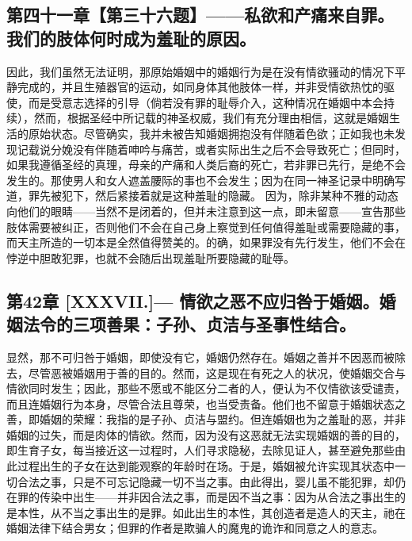 
\subsection{第四十一章【第三十六题】——私欲和产痛来自罪。我们的肢体何时成为羞耻的原因。}

因此，我们虽然无法证明，那原始婚姻中的婚姻行为是在没有情欲骚动的情况下平静完成的，并且生殖器官的运动，如同身体其他肢体一样，并非受情欲热忱的驱使，而是受意志选择的引导（倘若没有罪的耻辱介入，这种情况在婚姻中本会持续），然而，根据圣经中所记载的神圣权威，我们有充分理由相信，这就是婚姻生活的原始状态。尽管确实，我并未被告知婚姻拥抱没有伴随着色欲；正如我也未发现记载说分娩没有伴随着呻吟与痛苦，或者实际出生之后不会导致死亡；但同时，如果我遵循圣经的真理，母亲的产痛和人类后裔的死亡，若非罪已先行，是绝不会发生的。那使男人和女人遮盖腰际的事也不会发生；因为在同一神圣记录中明确写道，罪先被犯下，然后紧接着就是这种羞耻的隐藏。 因为，除非某种不雅的动态向他们的眼睛——当然不是闭着的，但并未注意到这一点，即未留意——宣告那些肢体需要被纠正，否则他们不会在自己身上察觉到任何值得羞耻或需要隐藏的事，而天主所造的一切本是全然值得赞美的。的确，如果罪没有先行发生，他们不会在悖逆中胆敢犯罪，也就不会随后出现羞耻所要隐藏的耻辱。\par


\subsection{第42章 [XXXVII.]— 情欲之恶不应归咎于婚姻。婚姻法令的三项善果：子孙、贞洁与圣事性结合。}

显然，那不可归咎于婚姻，即使没有它，婚姻仍然存在。婚姻之善并不因恶而被除去，尽管恶被婚姻用于善的目的。然而，这是现在有死之人的状况，使婚姻交合与情欲同时发生；因此，那些不愿或不能区分二者的人，便认为不仅情欲该受谴责，而且连婚姻行为本身，尽管合法且尊荣，也当受责备。他们也不留意于婚姻状态之善，即婚姻的荣耀：我指的是子孙、贞洁与盟约。但连婚姻也为之羞耻的恶，并非婚姻的过失，而是肉体的情欲。然而，因为没有这恶就无法实现婚姻的善的目的，即生育子女，每当接近这一过程时，人们寻求隐秘，去除见证人，甚至避免那些由此过程出生的子女在达到能观察的年龄时在场。于是，婚姻被允许实现其状态中一切合法之事，只是不可忘记隐藏一切不当之事。由此得出，婴儿虽不能犯罪，却仍在罪的传染中出生——并非因合法之事，而是因不当之事：因为从合法之事出生的是本性，从不当之事出生的是罪。如此出生的本性，其创造者是造人的天主，祂在婚姻法律下结合男女；但罪的作者是欺骗人的魔鬼的诡诈和同意之人的意志。\par

